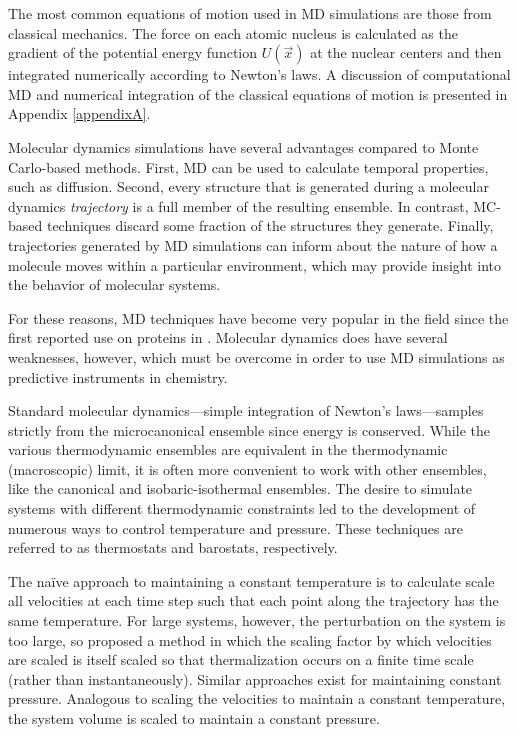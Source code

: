 The most common equations of motion used in MD simulations are those from
classical mechanics. The force on each atomic nucleus is calculated as the
gradient of the potential energy function $U(\vec{x})$ at the nuclear centers
and then integrated numerically according to Newton's laws. A discussion of
computational MD and numerical integration of the classical equations of motion
is presented in Appendix \ref{appendixA}.

Molecular dynamics simulations have several advantages compared to Monte
Carlo-based methods. First, MD can be used to calculate temporal properties,
such as diffusion. Second, every structure that is generated during a molecular
dynamics \emph{trajectory} is a full member of the resulting ensemble. In
contrast, MC-based techniques discard some fraction of the structures they
generate. Finally, trajectories generated by MD simulations can inform about the
nature of how a molecule moves within a particular environment, which may
provide insight into the behavior of molecular systems.

For these reasons, MD techniques have become very popular in the field since the
first reported use on proteins in \citeyear{McCammon_Nature_1977_v267_p585}.
\cite{McCammon_Nature_1977_v267_p585} Molecular dynamics does have several
weaknesses, however, which must be overcome in order to use MD simulations as
predictive instruments in chemistry.

Standard molecular dynamics---simple integration of Newton's laws---samples
strictly from the microcanonical ensemble since energy is conserved. While the
various thermodynamic ensembles are equivalent in the thermodynamic
(macroscopic) limit, it is often more convenient to work with other ensembles,
like the canonical and isobaric-isothermal ensembles. The desire to simulate
systems with different thermodynamic constraints led to the development of
numerous ways to control temperature and pressure.
\cite{Leach_Book_MolModel_2001} These techniques are referred to as thermostats
and barostats, respectively.

The na\"ive approach to maintaining a constant temperature is to calculate scale
all velocities at each time step such that each point along the trajectory has
the same temperature. \cite{Woodcock1971} For large systems, however, the
perturbation on the system is too large, so
\citeauthor{Berendsen_JChemPhys_1984_v81_p3684} proposed a method in which the
scaling factor by which velocities are scaled is itself scaled so that
thermalization occurs on a finite time scale (rather than instantaneously).
\cite{Berendsen_JChemPhys_1984_v81_p3684} Similar approaches exist for
maintaining constant pressure. \cite{Berendsen_JChemPhys_1984_v81_p3684}
Analogous to scaling the velocities to maintain a constant temperature, the
system volume is scaled to maintain a constant pressure.

